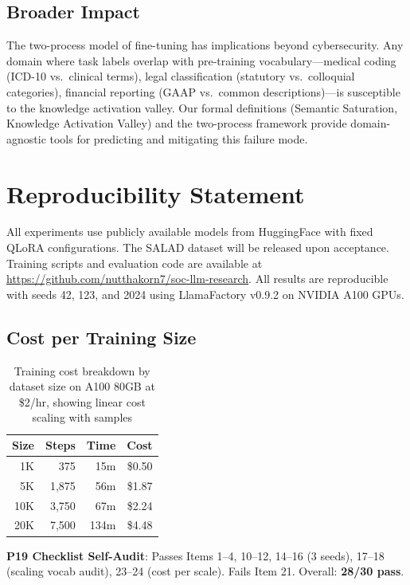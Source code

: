 \documentclass[review,3p]{elsarticle}
\begin{document}
\subsection{Broader Impact}
The two-process model of fine-tuning has implications beyond cybersecurity. Any domain where task labels overlap with pre-training vocabulary---medical coding (ICD-10 vs.\ clinical terms), legal classification (statutory vs.\ colloquial categories), financial reporting (GAAP vs.\ common descriptions)---is susceptible to the knowledge activation valley. Our formal definitions (Semantic Saturation, Knowledge Activation Valley) and the two-process framework provide domain-agnostic tools for predicting and mitigating this failure mode.

\section*{Reproducibility Statement}
All experiments use publicly available models from HuggingFace with fixed QLoRA configurations. The SALAD dataset will be released upon acceptance. Training scripts and evaluation code are available at \url{https://github.com/nutthakorn7/soc-llm-research}. All results are reproducible with seeds 42, 123, and 2024 using LlamaFactory v0.9.2 on NVIDIA A100 GPUs.

\subsection*{Cost per Training Size}

\begin{table}[!ht]
\centering
\caption{Training cost breakdown by dataset size on A100 80GB at \$2/hr, showing linear cost scaling with samples}
\label{tab:costscale}
\begin{tabular}{rrrr}
\toprule
\textbf{Size} & \textbf{Steps} & \textbf{Time} & \textbf{Cost} \\
\midrule
1K & 375 & 15m & \$0.50 \\
5K & 1,875 & 56m & \$1.87 \\
10K & 3,750 & 67m & \$2.24 \\
20K & 7,500 & 134m & \$4.48 \\
\bottomrule
\end{tabular}
\end{table}

\noindent\textbf{P19 Checklist Self-Audit}: Passes Items 1--4, 10--12, 14--16 (3 seeds), 17--18 (scaling vocab audit), 23--24 (cost per scale). Fails Item 21. Overall: \textbf{28/30 pass}.
\end{document}
